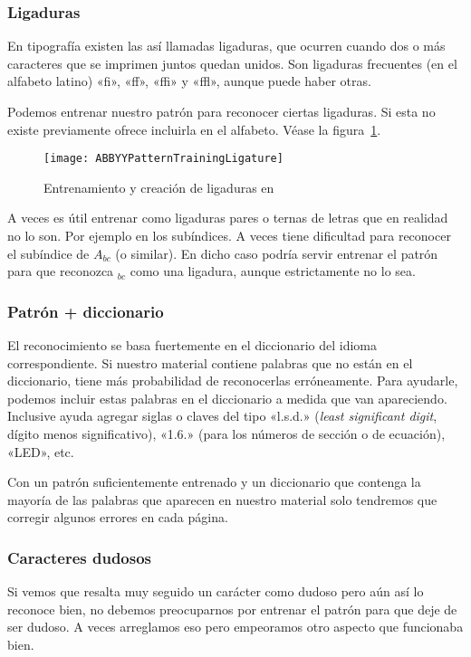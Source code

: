 \documentclass[%
	a5paper,
	10pt,
	twoside,
	openright,
	final,
]{memoir}
\begin{document}
{	\subsubsection{Ligaduras} En tipografía existen las así llamadas ligaduras, que ocurren cuando dos o más caracteres que se imprimen juntos quedan unidos. Son ligaduras frecuentes (en el alfabeto latino) «fi», «ff», «ffi» y «ffl», aunque puede haber otras.

	Podemos entrenar nuestro patrón para reconocer ciertas ligaduras. Si esta no existe previamente \abbyy ofrece incluirla en el alfabeto. Véase la figura~\ref{fig:ABBYYPatternTrainingLigature}.

	\begin{figure}
		\texttt{[image: ABBYYPatternTrainingLigature]}
		\caption{Entrenamiento y creación de ligaduras en \abbyy\label{fig:ABBYYPatternTrainingLigature}}
	\end{figure}

	A veces es útil entrenar como ligaduras pares o ternas de letras que en realidad no lo son. Por ejemplo en los subíndices. A veces \abbyy tiene dificultad para reconocer el subíndice de $A_{bc}$ (o similar). En dicho caso podría servir entrenar el patrón para que reconozca $_{bc}$ como una ligadura, aunque estrictamente no lo sea.

	\subsubsection{Patrón + diccionario} El reconocimiento se basa fuertemente en el diccionario del idioma correspondiente. Si nuestro material contiene palabras que no están en el diccionario, \abbyy tiene más probabilidad de reconocerlas erróneamente. Para ayudarle, podemos incluir estas palabras en el diccionario a medida que van apareciendo. Inclusive ayuda agregar siglas o claves del tipo «l.s.d.» (\emph{least significant digit}, dígito menos significativo), «1.6.» (para los números de sección o de ecuación), «LED», etc.

	Con un patrón suficientemente entrenado y un diccionario que contenga la mayoría de las palabras que aparecen en nuestro material solo tendremos que corregir algunos errores en cada página.

	\subsubsection{Caracteres dudosos} Si vemos que resalta muy seguido un carácter como dudoso pero aún así lo reconoce bien, no debemos preocuparnos por entrenar el patrón para que deje de ser dudoso. A veces arreglamos eso pero empeoramos otro aspecto que funcionaba bien. %

}
\end{document}
